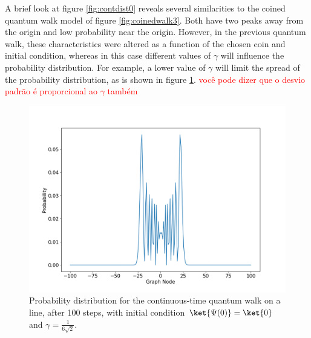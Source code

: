             A brief look at figure \ref{fig:contdist0} reveals several similarities to the coined quantum walk model of figure \ref{fig:coinedwalk3}. Both have two peaks away from the origin and low probability near the origin.
             However, in the previous quantum walk, these characteristics were altered as a function of the chosen coin and initial condition, whereas in this case different values of $\gamma$ will influence the probability distribution. For example, a lower value of $\gamma$ will limit the spread of the probability distribution, as is shown in figure \ref{fig:contdist1}. \textcolor{red}{você pode dizer que o desvio padrão é proporcional ao $\gamma$ também}
                \begin{figure}[!h]
                    \centering
                    \includegraphics[scale=0.40]{img/ContQuantumWalk/ctqwSinglePsi0LowerGamma.png}
                    \caption{Probability distribution for the continuous-time quantum walk on a line, after 100 steps, with initial condition $\ket{\Psi(0)}=\ket{0}$ and $\gamma=\frac{1}{6\sqrt{2}}$.} 
                    \label{fig:contdist1}
                \end{figure}
                
